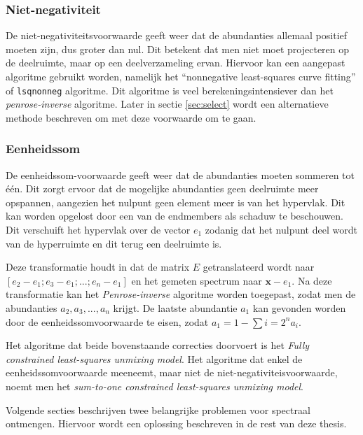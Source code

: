 \documentclass[12pt]{report}
\begin{document}
\subsubsection{Niet-negativiteit}

De niet-negativiteitsvoorwaarde geeft weer dat de abundanties allemaal positief moeten zijn, dus groter dan nul. Dit betekent dat men niet moet projecteren op de deelruimte, maar op een deelverzameling ervan. Hiervoor kan een aangepast algoritme gebruikt worden, namelijk het ``nonnegative least-squares curve fitting'' of \texttt{lsqnonneg} algoritme. Dit algoritme is veel berekeningsintensiever dan het \textit{penrose-inverse} algoritme. Later in sectie \ref{sec:select} wordt een alternatieve methode beschreven om met deze voorwaarde om te gaan.

\subsubsection{Eenheidssom}

De eenheidssom-voorwaarde geeft weer dat de abundanties moeten sommeren tot \'e\'en. Dit zorgt ervoor dat de mogelijke abundanties geen deelruimte meer opspannen, aangezien het nulpunt geen element meer is van het hypervlak. Dit kan worden opgelost door een van de endmembers als schaduw te beschouwen. Dit verschuift het hypervlak over de vector $e_1$ zodanig dat het nulpunt deel wordt van de hyperruimte en dit terug een deelruimte is.

Deze transformatie houdt in dat de matrix $E$ getranslateerd wordt naar $[e_2-e_1;e_3-e_1;...;e_n-e_1]$ en het gemeten spectrum naar $\bm{x} - e_1$. Na deze transformatie kan het \textit{Penrose-inverse} algoritme worden toegepast, zodat men de abundanties $a_2,a_3,...,a_n$ krijgt. De laatste abundantie $a_1$ kan gevonden worden door de eenheidssomvoorwaarde te eisen, zodat $a_1 = 1 - \sum{i=2}^{n} a_i$.

\vspace{5 mm}
Het algoritme dat beide bovenstaande correcties doorvoert is het \textit{Fully constrained
least-squares unmixing model}. Het algoritme dat enkel de eenheidssomvoorwaarde meeneemt, maar niet de niet-negativiteisvoorwaarde, noemt men het \textit{sum-to-one
constrained least-squares unmixing model}.


 
\vspace{5 mm}

Volgende secties beschrijven twee belangrijke problemen voor spectraal ontmengen. Hiervoor wordt een oplossing beschreven in de rest van deze thesis.
\end{document}
